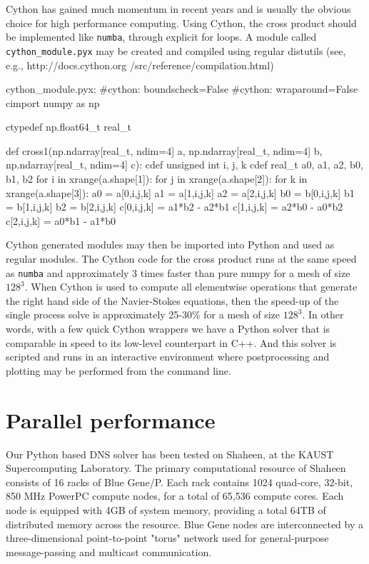\documentclass[11pt, oneside]{article}
\newcommand{\inpyth}{\lstinline[style=pythonstyle, basicstyle=\ttfamily]} %[]%
\begin{document}
Cython has gained much momentum in recent years and is usually the obvious choice for high performance computing. Using Cython, the cross product should be implemented like \inpyth{numba}, through explicit for loops. A module called \inpyth{cython_module.pyx} may be created and compiled using regular distutils (see, e.g., http://docs.cython.org /src/reference/compilation.html)
\begin{python}
cython_module.pyx:
#cython: boundscheck=False
#cython: wraparound=False
cimport numpy as np

ctypedef np.float64_t real_t

def cross1(np.ndarray[real_t, ndim=4] a,
           np.ndarray[real_t, ndim=4] b,
           np.ndarray[real_t, ndim=4] c):
    cdef unsigned int i, j, k
    cdef real_t a0, a1, a2, b0, b1, b2
    for i in xrange(a.shape[1]):
        for j in xrange(a.shape[2]):
            for k in xrange(a.shape[3]):
                a0 = a[0,i,j,k]
                a1 = a[1,i,j,k]
                a2 = a[2,i,j,k]
                b0 = b[0,i,j,k]
                b1 = b[1,i,j,k]
                b2 = b[2,i,j,k]
                c[0,i,j,k] = a1*b2 - a2*b1
                c[1,i,j,k] = a2*b0 - a0*b2
                c[2,i,j,k] = a0*b1 - a1*b0

\end{python}
Cython generated modules may then be imported into Python and used as regular modules. The Cython code for the cross product runs at the same speed as \inpyth{numba} and approximately 3 times faster than pure numpy for a mesh of size $128^3$. When Cython is used to compute all elementwise operations that generate the right hand side of the Navier-Stokes equations, then the speed-up of the single process solve is approximately 25-30\% for a mesh of size $128^3$. In other words, with a few quick Cython wrappers we have a Python solver that is comparable in speed to its low-level counterpart in C++. And this solver is scripted and runs in an interactive environment where postprocessing and plotting may be performed from the command line.

\section{Parallel performance}
Our Python based DNS solver has been tested on Shaheen, at the KAUST Supercomputing Laboratory. The primary computational resource of Shaheen consists of 16 racks of Blue Gene/P. Each rack contains 1024 quad-core, 32-bit, 850 MHz PowerPC compute nodes, for a total of 65,536 compute cores. Each node is equipped with 4GB of system memory, providing a total 64TB of distributed memory across the resource. Blue Gene nodes are interconnected by a three-dimensional point-to-point "torus" network used for general-purpose message-passing and multicast communication. 
\end{document}
